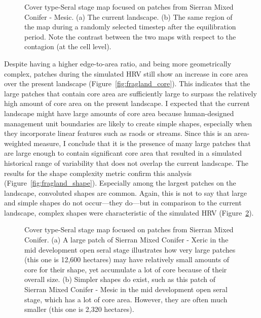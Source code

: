 \begin{figure}[!htbp]
  \centering
  \caption{Cover type-Seral stage map focused on patches from Sierran Mixed Conifer - Mesic. (a) The current landscape. (b) The same region of the map during a randomly selected timestep after the equilibration period. Note the contrast between the two maps with respect to the contagion (at the cell level).} 
  \label{fig:patchmaps3} %
\end{figure}

Despite having a higher edge-to-area ratio, and being more geometrically complex, patches during the simulated HRV still show an increase in core area over the present landscape (Figure~\ref{fig:fragland_core}). This indicates that the large patches that contain core area are sufficiently large to surpass the relatively high amount of core area on the present landscape. I expected that the current landscape might have large amounts of core area because human-designed management unit boundaries are likely to create simple shapes, especially when they incorporate linear features such as raods or streams. Since this is an area-weighted measure, I conclude that it is the presence of many large patches that are large enough to contain significant core area that resulted in a simulated historical range of variability that does not overlap the current landscape. The results for the shape complexity metric confirm this analysis (Figure~\ref{fig:fragland_shape}). Especially among the largest patches on the landscape, convoluted shapes are common. Again, this is not to say that large and simple shapes do not occur---they do---but in comparison to the current landscape, complex shapes were characteristic of the simulated HRV (Figure~\ref{fig:patchmaps4}).

\begin{figure}[!htbp]
  \centering
  \caption{Cover type-Seral stage map focused on patches from Sierran Mixed Conifer. (a) A large patch of Sierran Mixed Conifer - Xeric in the mid development open seral stage illustrates how very large patches (this one is 12,600 hectares) may have relatively small amounts of core for their shape, yet accumulate a lot of core because of their overall size. (b) Simpler shapes do exist, such as this patch of Sierran Mixed Conifer - Mesic in the mid development open seral stage, which has a lot of core area. However, they are often much smaller (this one is 2,320 hectares).}
  \label{fig:patchmaps4}
\end{figure}


